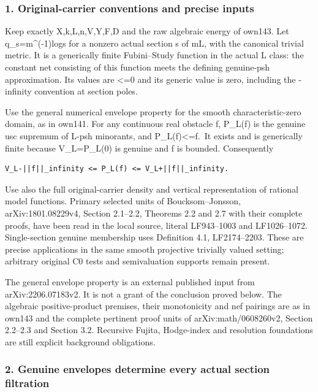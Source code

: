 \documentclass[
  10pt,
]{article}
\begin{document}
\subsubsection{1. Original-carrier conventions and precise
inputs}\label{original-carrier-conventions-and-precise-inputs}

Keep exactly X,k,L,n,V,Y,F,D and the raw algebraic energy of own143. Let
q\_s=m\^{}(-1)log\textbar s\textbar{} for a nonzero actual section s of
mL, with the canonical trivial metric. It is a generically finite
Fubini--Study function in the actual L class: the constant net
consisting of this function meets the defining genuine-psh
approximation. Its values are \textless=0 and its generic value is zero,
including the -infinity convention at section poles.

Use the general numerical envelope property for the smooth
characteristic-zero domain, as in own141. For any continuous real
obstacle f, P\_L(f) is the genuine usc supremum of L-psh minorants, and
P\_L(f)\textless=f.~It exists and is generically finite because
V\_L=P\_L(0) is genuine and f is bounded. Consequently

\begin{verbatim}
V_L-||f||_infinity <= P_L(f) <= V_L+||f||_infinity.
\end{verbatim}

Use also the full original-carrier density and vertical representation
of rational model functions. Primary selected units of
Boucksom--Jonsson, arXiv:1801.08229v4, Section 2.1--2.2, Theorems 2.2
and 2.7 with their complete proofs, have been read in the local source,
literal LF943--1003 and LF1026--1072. Single-section genuine membership
uses Definition 4.1, LF2174--2203. These are precise applications in the
same smooth projective trivially valued setting; arbitrary original C0
tests and semivaluation supports remain present.

The general envelope property is an external published input from
arXiv:2206.07183v2. It is not a grant of the conclusion proved below.
The algebraic positive-product premises, their monotonicity and nef
pairings are as in own143 and the complete pertinent proof units of
arXiv:math/0608260v2, Section 2.2--2.3 and Section 3.2. Recursive
Fujita, Hodge-index and resolution foundations are still explicit
background obligations.

\subsubsection{2. Genuine envelopes determine every actual section
filtration}\label{genuine-envelopes-determine-every-actual-section-filtration}
\end{document}
